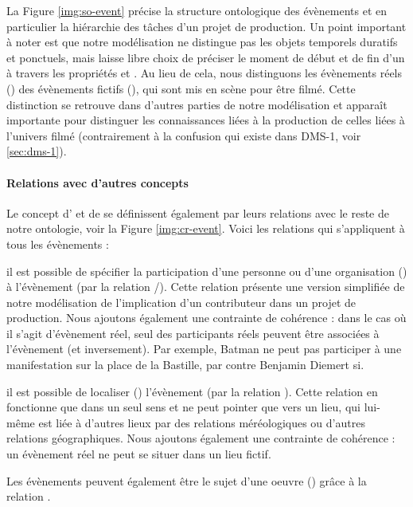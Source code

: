 La Figure \ref{img:so-event} précise la structure ontologique des évènements et en particulier la hiérarchie des tâches d'un projet de production.
Un point important à noter est que notre modélisation ne distingue pas les objets temporels duratifs et ponctuels, mais laisse libre choix de préciser le moment de début et de fin d'un  à travers les propriétés  et .
Au lieu de cela, nous distinguons les évènements réels () des évènements fictifs (), qui sont mis en scène pour être filmé. 
Cette distinction se retrouve dans d'autres parties de notre modélisation et apparaît importante pour distinguer les connaissances liées à la production de celles liées à l'univers filmé (contrairement à la confusion qui existe dans DMS-1, voir \ref{sec:dms-1}).



\paragraph{Relations avec d'autres concepts}
Le concept d' et de  se définissent également par leurs relations avec le reste de notre ontologie, voir la Figure \ref{img:cr-event}. 
Voici les relations qui s'appliquent à tous les évènements : 
\begin{liste}
	\item il est possible de spécifier la participation d'une personne ou d'une organisation () à l'évènement (par la relation /).
	Cette relation présente une version simplifiée de notre modélisation de l'implication d'un contributeur dans un projet de production.
	Nous ajoutons également une contrainte de cohérence : dans le cas où il s'agit d'évènement réel, seul des participants réels peuvent être associées à l'évènement (et inversement). 
	Par exemple, Batman ne peut pas participer à une manifestation sur la place de la Bastille, par contre Benjamin Diemert si. 

	\item il est possible de localiser () l'évènement (par la relation ).
	Cette relation en fonctionne que dans un seul sens et ne peut pointer que vers un lieu, qui lui-même est liée à d'autres lieux par des relations méréologiques ou d'autres relations géographiques.
	Nous ajoutons également une contrainte de cohérence : un évènement réel ne peut se situer dans un lieu fictif.

	\item Les évènements peuvent également être le sujet d'une oeuvre () grâce à la relation . 
\end{liste}


